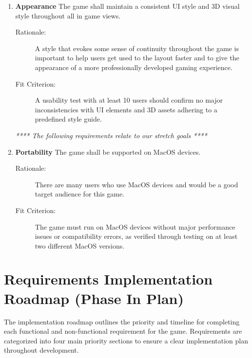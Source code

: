 \begin{enumerate}[label=NFR\arabic*, start=1, left=0pt]
    \item \label{NFR9} \textbf{Appearance} The game shall maintain a consistent UI style and 3D visual style throughout all in game views.
    \begin{description}
        \item[Rationale:] A style that evokes some sense of continuity throughout the game is important to help users get used to the layout faster and to give the appearance of a more professionally developed gaming experience.
        \item[Fit Criterion:] A usability test with at least 10 users should confirm no major inconsistencies with UI elements and 3D assets adhering to a predefined style guide.
    \end{description}

    \textit{**** The following requirements relate to our stretch goals ****}
    \item \label{NFR10} \textbf{Portability} The game shall be supported on MacOS devices.
    \begin{description}
        \item[Rationale:] There are many users who use MacOS devices and would be a good target audience for this game.
        \item[Fit Criterion:] The game must run on MacOS devices without major performance issues or compatibility errors, as verified through testing on at least two different MacOS versions.
    \end{description}

\end{enumerate}

\newpage
\section{Requirements Implementation Roadmap (Phase In Plan)}

The implementation roadmap outlines the priority and timeline for completing each functional and non-functional requirement for the game. Requirements are categorized into four main priority sections to ensure a clear implementation plan throughout development.

